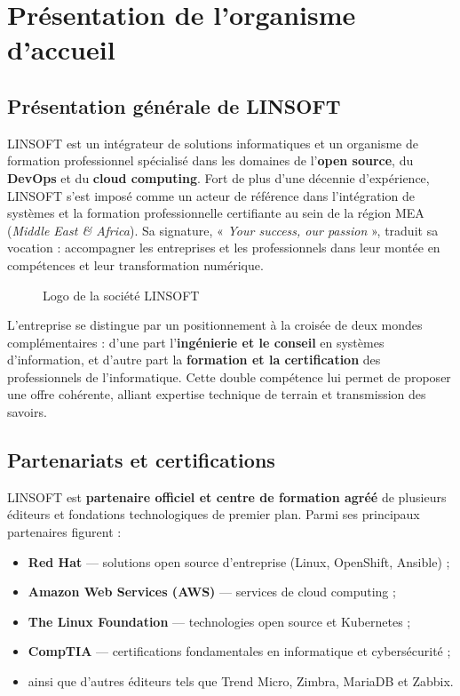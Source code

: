 \documentclass[12pt,a4paper,oneside]{report}
\newcommand{\ph}[2][0.6\textwidth]{%
  \fbox{\parbox[c][2.6cm][c]{#1}{\centering\itshape\color{gris} #2}}}
\begin{document}
\section{Présentation de l'organisme d'accueil}

\subsection{Présentation générale de LINSOFT}
LINSOFT est un intégrateur de solutions informatiques et un organisme de formation
professionnel spécialisé dans les domaines de l'\textbf{open source}, du \textbf{DevOps} et du
\textbf{cloud computing}. Fort de plus d'une décennie d'expérience, LINSOFT s'est imposé comme
un acteur de référence dans l'intégration de systèmes et la formation professionnelle
certifiante au sein de la région MEA (\textit{Middle East \& Africa}). Sa signature,
« \textit{Your success, our passion} », traduit sa vocation : accompagner les entreprises et
les professionnels dans leur montée en compétences et leur transformation numérique.

\begin{figure}[H]\centering
  \ph[0.35\textwidth]{[ Logo de LINSOFT ]}
  \caption{Logo de la société LINSOFT}\label{fig:logo-linsoft}
\end{figure}

L'entreprise se distingue par un positionnement à la croisée de deux mondes complémentaires :
d'une part l'\textbf{ingénierie et le conseil} en systèmes d'information, et d'autre part la
\textbf{formation et la certification} des professionnels de l'informatique. Cette double
compétence lui permet de proposer une offre cohérente, alliant expertise technique de terrain
et transmission des savoirs.

\subsection{Partenariats et certifications}
LINSOFT est \textbf{partenaire officiel et centre de formation agréé} de plusieurs éditeurs et
fondations technologiques de premier plan. Parmi ses principaux partenaires figurent :

\begin{itemize}[leftmargin=1.2cm]
  \item \textbf{Red Hat} — solutions open source d'entreprise (Linux, OpenShift, Ansible) ;
  \item \textbf{Amazon Web Services (AWS)} — services de cloud computing ;
  \item \textbf{The Linux Foundation} — technologies open source et Kubernetes ;
  \item \textbf{CompTIA} — certifications fondamentales en informatique et cybersécurité ;
  \item ainsi que d'autres éditeurs tels que Trend Micro, Zimbra, MariaDB et Zabbix.
\end{itemize}
\end{document}

